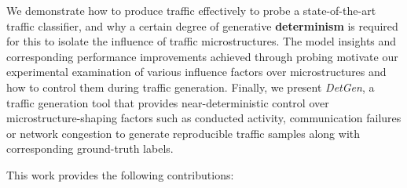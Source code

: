 \documentclass[runningheads]{llncs}
\begin{document}
We demonstrate how to produce traffic effectively to probe a state-of-the-art traffic classifier, and why a certain degree of generative \textbf{determinism} is required for this to isolate the influence of traffic microstructures. The model insights and corresponding performance improvements achieved through probing motivate our experimental examination of various influence factors over microstructures and how to control them during traffic generation. Finally, we present \emph{DetGen}, a traffic generation tool that provides near-deterministic control over microstructure-shaping factors such as conducted activity, communication failures or network congestion to generate reproducible traffic samples along with corresponding ground-truth labels. %




 
This work provides the following contributions:
\end{document}
